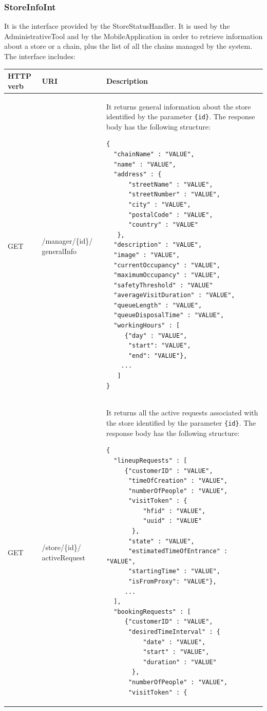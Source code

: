 \documentclass[a4paper,oneside,11pt]{book}
\begin{document}
    \subsubsection{StoreInfoInt}
    It is the interface provided by the StoreStatusHandler. It is used by the AdministrativeTool and by the MobileApplication in order to retrieve information about a store or a chain, plus the list of all the chains managed by the system. The interface includes:
    \begin{longtable}[c] { |>{\centering\arraybackslash}P{0.11\textwidth}|>{\centering\arraybackslash\ttfamily}H{0.23\textwidth}|H{0.50\textwidth}| }
        \hline
        \textbf{HTTP verb} & \textrm{\textbf{URI}} & \textbf{\textbf{Description}} \\ \hline
        GET &/manager/\{id\}/ generalInfo & It returns general information about the store identified by the parameter \texttt{\{id\}}. The response body has the following structure:
        \begin{lstlisting}[language=jsonDD]
{  
  "chainName" : "VALUE",
  "name" : "VALUE",
  "address" : {
      "streetName" : "VALUE",
      "streetNumber" : "VALUE",
      "city" : "VALUE",
      "postalCode" : "VALUE",
      "country" : "VALUE"
   },
  "description" : "VALUE",
  "image" : "VALUE",
  "currentOccupancy" : "VALUE",
  "maximumOccupancy" : "VALUE",
  "safetyThreshold" : "VALUE"
  "averageVisitDuration" : "VALUE",
  "queueLength" : "VALUE",
  "queueDisposalTime" : "VALUE",
  "workingHours" : [
     {"day" : "VALUE",
      "start": "VALUE",
      "end": "VALUE"},
    ...
   ]
}
        \end{lstlisting} \\ \hline
        GET & /store/\{id\}/ activeRequest & It returns all the active requests associated with the store identified by the parameter \texttt{\{id\}}. The response body has the following structure:
        \begin{lstlisting}[language=jsonDD]
{
  "lineupRequests" : [
     {"customerID" : "VALUE",
      "timeOfCreation" : "VALUE",
      "numberOfPeople" : "VALUE",
      "visitToken" : {
          "hfid" : "VALUE",
          "uuid" : "VALUE"
       },
      "state" : "VALUE",
      "estimatedTimeOfEntrance" : "VALUE",
      "startingTime" : "VALUE",
      "isFromProxy": "VALUE"},
     ...
  ],
  "bookingRequests" : [
     {"customerID" : "VALUE",
      "desiredTimeInterval" : {
          "date" : "VALUE",
          "start" : "VALUE",
          "duration" : "VALUE"
       },
      "numberOfPeople" : "VALUE",
      "visitToken" : {

\end{lstlisting}
\end{longtable}
\end{document}
